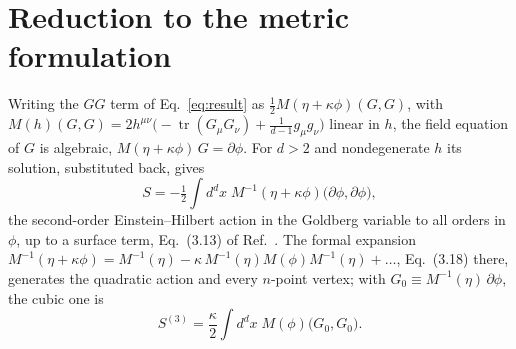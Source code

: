 \documentclass[prd,aps,preprint,nofootinbib,amsmath,amssymb,eqsecnum]{revtex4-2}
\begin{document}
\section{Reduction to the metric formulation}
\label{sec:checks}

Writing the $GG$ term of Eq.~\eqref{eq:result}
as $\tfrac12 M(\eta+\kappa\phi)(G,G)$, with
$M(h)(G,G)=2h^{\mu\nu}\big(-\operatorname{tr}(G_\mu G_\nu)+\tfrac{1}{d-1}g_\mu g_\nu\big)$
linear in $h$, the field equation of $G$ is algebraic, $M(\eta+\kappa\phi)\,G=\partial\phi$.
For $d>2$ and nondegenerate $h$ its solution, substituted back, gives
\begin{equation}
S=-\tfrac12\int d^dx\;M^{-1}(\eta+\kappa\phi)\big(\partial\phi,\partial\phi\big),
\label{eq:second}
\end{equation}
the second-order Einstein--Hilbert action in the Goldberg variable to all orders in $\phi$,
up to a surface term, Eq.~(3.13) of Ref.~\cite{BrandtMcKeon2016}. The formal expansion
$M^{-1}(\eta+\kappa\phi)=M^{-1}(\eta)-\kappa\,M^{-1}(\eta)M(\phi)M^{-1}(\eta)+\dots$,
Eq.~(3.18) there, generates the quadratic action and every $n$-point vertex; with
$G_0\equiv M^{-1}(\eta)\,\partial\phi$, the cubic one is
\begin{equation}
S^{(3)}=\frac{\kappa}{2}\int d^dx\;M(\phi)\big(G_0,G_0\big).
\label{eq:cubicvertex}
\end{equation}
\end{document}

